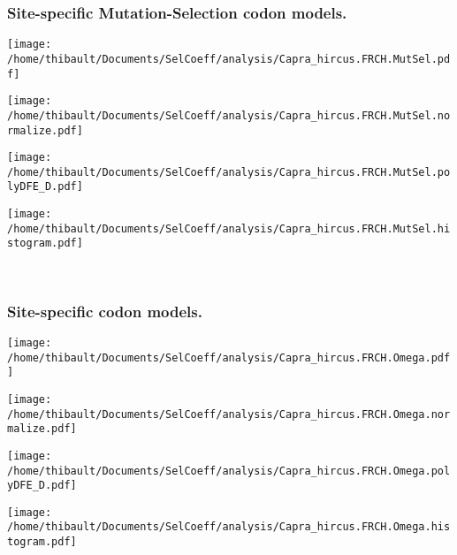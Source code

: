 \subsubsection*{Site-specific Mutation-Selection codon models.} 
\begin{minipage}{0.49\linewidth} 
\texttt{[image: /home/thibault/Documents/SelCoeff/analysis/Capra\_hircus.FRCH.MutSel.pdf]} 
\end{minipage}
\begin{minipage}{0.49\linewidth} 
\texttt{[image: /home/thibault/Documents/SelCoeff/analysis/Capra\_hircus.FRCH.MutSel.normalize.pdf]} 
\end{minipage}
\begin{minipage}{0.49\linewidth} 
\texttt{[image: /home/thibault/Documents/SelCoeff/analysis/Capra\_hircus.FRCH.MutSel.polyDFE\_D.pdf]} 
\end{minipage}
\begin{minipage}{0.49\linewidth} 
\texttt{[image: /home/thibault/Documents/SelCoeff/analysis/Capra\_hircus.FRCH.MutSel.histogram.pdf]} 
\end{minipage}
\\ 
\subsubsection*{Site-specific codon models.} 
\begin{minipage}{0.49\linewidth} 
\texttt{[image: /home/thibault/Documents/SelCoeff/analysis/Capra\_hircus.FRCH.Omega.pdf]} 
\end{minipage}
\begin{minipage}{0.49\linewidth} 
\texttt{[image: /home/thibault/Documents/SelCoeff/analysis/Capra\_hircus.FRCH.Omega.normalize.pdf]} 
\end{minipage}
\begin{minipage}{0.49\linewidth} 
\texttt{[image: /home/thibault/Documents/SelCoeff/analysis/Capra\_hircus.FRCH.Omega.polyDFE\_D.pdf]} 
\end{minipage}
\begin{minipage}{0.49\linewidth} 
\texttt{[image: /home/thibault/Documents/SelCoeff/analysis/Capra\_hircus.FRCH.Omega.histogram.pdf]} 
\end{minipage}
\\ 
